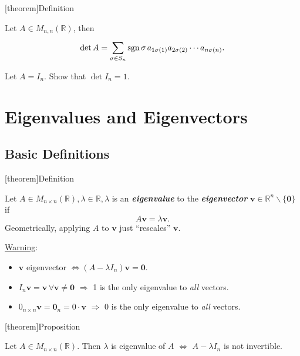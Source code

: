 \documentclass[12pt]{report}
\theoremstyle{definition}
\begin{document}
[theorem]{Definition}
\begin{det of A}
    Let $A \in M_{n,n}(\mathbb{R})$, then \[\det{A} = 
    \sum_{\sigma \in S_n}^{} \textnormal{sgn}\,\sigma\, a_{1\sigma(1)}a_{2\sigma(2)}\cdots a_{n\sigma(n)}.\]
\end{det of A}

\begin{ex}
        Let $A = I_n$. Show that $\det{I_n} = 1$.
\end{ex}

\section{Eigenvalues and Eigenvectors}

\subsection{Basic Definitions}

[theorem]{Definition}
\begin{eigenvalue and vector}
    Let $A \in M_{n\times n}(\mathbb{R}), \lambda \in \mathbb{R}, \lambda$ is an \textbf{\emph{eigenvalue}}
    to the \textbf{\emph{eigenvector}} $\mathbf{\mathbf{v}} \in \mathbb{R}^{n}\backslash\{\mathbf{0}\}$ if\[
        A\mathbf{\mathbf{v}} = \lambda\mathbf{\mathbf{v}}.
    \]
    Geometrically, applying $A$ to $\mathbf{\mathbf{v}}$ just ``rescales'' $\mathbf{\mathbf{v}}$.
\end{eigenvalue and vector}

\underline{Warning}:
\begin{itemize}
    \item $\mathbf{\mathbf{v}}$ eigenvector $\iff (A-\lambda I_n)\mathbf{\mathbf{v}} = \mathbf{0}$.
    \item $I_n \mathbf{\mathbf{v}} = \mathbf{\mathbf{v}} \,\forall \mathbf{\mathbf{v}} \neq \mathbf{0}$
        $\Rightarrow{}$ 1 is the only eigenvalue to \emph{all} vectors.
    \item $0_{n\times n} \mathbf{\mathbf{v}} = \mathbf{0}_n = 0\cdot\mathbf{\mathbf{v}}$ 
        $\Rightarrow{}$ 0 is the only eigenvalue to \emph{all} vectors.
\end{itemize}

[theorem]{Proposition}
\begin{eigenvalue property}
    Let $A \in M_{n\times n}(\mathbb{R})$.
    Then $\lambda$ is eigenvalue of $A$ $\iff$ $A-\lambda I_n$ is not invertible.
\end{eigenvalue property}
\end{document}

